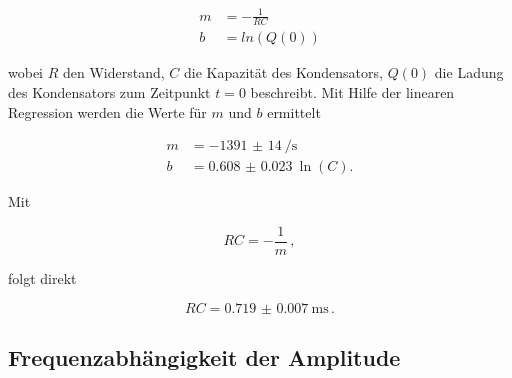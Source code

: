 \begin{align*}
  m &= - \frac{1}{RC} \\
  b &= ln(Q(0))
\end{align*}

wobei $R$ den Widerstand, $C$ die Kapazität des Kondensators, $Q(0)$ die Ladung des Kondensators zum Zeitpunkt
$t=0$ beschreibt. Mit Hilfe der linearen Regression werden die Werte für $m$ und $b$ ermittelt

\begin{align*}
  m &= \SI{-1391(14)}{\per\second} \\
  b &= \SI{0.608(23)}{\ln(C)}.
\end{align*}

Mit

\begin{equation*}
  RC = -\frac{1}{m} \, ,
\end{equation*}

folgt direkt

\begin{equation*}
  RC = \SI{0.719(7)}{\milli\second} \, .
\end{equation*}

\subsection{Frequenzabhängigkeit der Amplitude}


